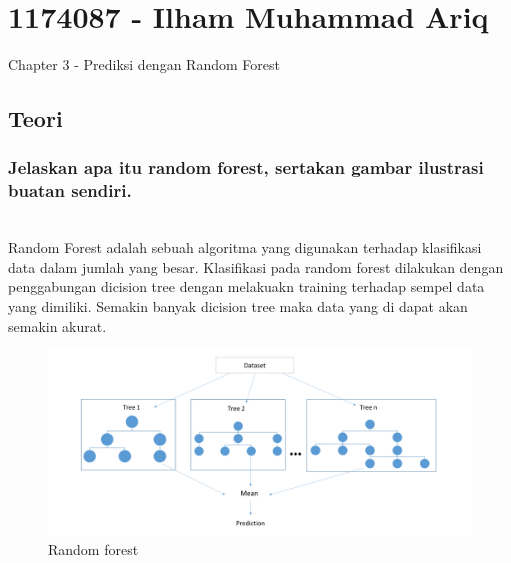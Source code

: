 \section{1174087 - Ilham Muhammad Ariq}
Chapter 3 - Prediksi dengan Random Forest
\subsection{Teori}
\subsubsection{ Jelaskan apa itu random forest, sertakan gambar ilustrasi buatan sendiri.}
\hfill\\
Random Forest adalah sebuah algoritma yang digunakan terhadap klasifikasi data dalam jumlah yang besar. Klasifikasi pada random forest dilakukan dengan penggabungan dicision tree dengan melakuakn training terhadap sempel data yang dimiliki. Semakin banyak dicision tree maka data yang di dapat akan
semakin akurat.

\begin{figure}[H]
	\centering
	\includegraphics[width=12cm]{figures/1174087/3/1.png}
	\caption{Random forest}
\end{figure}


